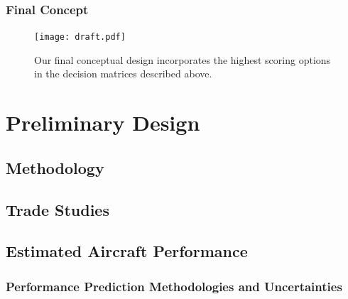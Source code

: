 \documentclass[report]{byu-aero}
\begin{document}
\subsubsection{Final Concept}
\label{sssec:finalconcept}

\begin{figure}[h!]
	\centering
	\texttt{[image: draft.pdf]}
	\caption{Our final conceptual design incorporates the highest scoring options in the decision matrices described above.}
	\label{fig:finalconcept}
\end{figure}



\section{Preliminary Design} %
\label{sec:PreliminaryDesign}


\subsection{Methodology}
\label{ssec:methodology}




\subsection{Trade Studies}
\label{ssec:tradestudies}




\subsection{Estimated Aircraft Performance}
\label{ssec:estaircraftperfomance}




\subsubsection{Performance Prediction Methodologies and Uncertainties}
\label{sssec:uncertaintyanalysis}
\end{document}
